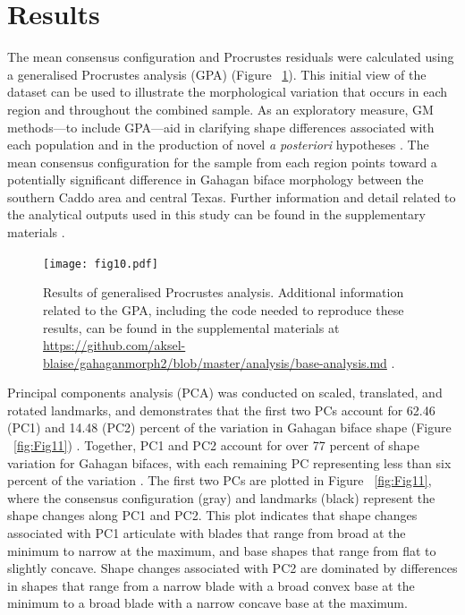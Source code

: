 \documentclass[review]{elsarticle}
\begin{document}
\section*{Results}

The mean consensus configuration and Procrustes residuals were calculated using a generalised Procrustes analysis (GPA) \citep[Figure 3]{RN1720} (Figure ~\ref{fig:Fig10}). This initial view of the dataset can be used to illustrate the morphological variation that occurs in each region and throughout the combined sample. As an exploratory measure, GM methods---to include GPA---aid in clarifying shape differences associated with each population and in the production of novel \textit{a posteriori} hypotheses \citep{RN1720}. The mean consensus configuration for the sample from each region points toward a potentially significant difference in Gahagan biface morphology between the southern Caddo area and central Texas. Further information and detail related to the analytical outputs used in this study can be found in the supplementary materials \citep{RN20850}.

\begin{figure}[h]\centering
\texttt{[image: fig10.pdf]}
\caption{Results of generalised Procrustes analysis. Additional information related to the GPA, including the code needed to reproduce these results, can be found in the supplemental materials at \href{https://github.com/aksel-blaise/gahaganmorph2/blob/master/analysis/base-analysis.md}{https://github.com/aksel-blaise/gahaganmorph2/blob/master/analysis/base-analysis.md} \citep{RN20850}.}
\label{fig:Fig10}
\end{figure}

Principal components analysis (PCA) was conducted on scaled, translated, and rotated landmarks, and demonstrates that the first two PCs account for 62.46 (PC1) and 14.48 (PC2) percent of the variation in Gahagan biface shape (Figure ~\ref{fig:Fig11}) \citep{RN20850}. Together, PC1 and PC2 account for over 77 percent of shape variation for Gahagan bifaces, with each remaining PC representing less than six percent of the variation \citep{RN20850}. The first two PCs are plotted in Figure ~\ref{fig:Fig11}, where the consensus configuration (gray) and landmarks (black) represent the shape changes along PC1 and PC2. This plot indicates that shape changes associated with PC1 articulate with blades that range from broad at the minimum to narrow at the maximum, and base shapes that range from flat to slightly concave. Shape changes associated with PC2 are dominated by differences in shapes that range from a narrow blade with a broad convex base at the minimum to a broad blade with a narrow concave base at the maximum.
\end{document}
